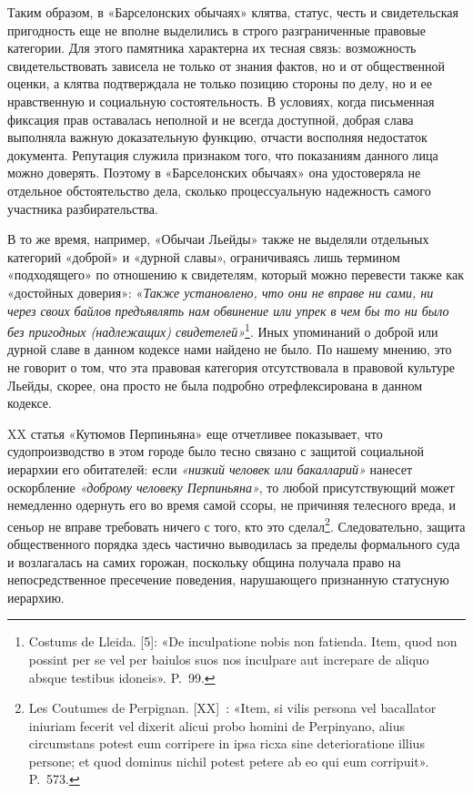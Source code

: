 Таким образом, в «Барселонских обычаях» клятва, статус, честь и свидетельская пригодность еще не вполне выделились в строго разграниченные правовые категории. Для этого памятника характерна их тесная связь: возможность свидетельствовать зависела не только от знания фактов, но и от общественной оценки, а клятва подтверждала не только позицию стороны по делу, но и ее нравственную и социальную состоятельность. В условиях, когда письменная фиксация прав оставалась неполной и не всегда доступной, добрая слава выполняла важную доказательную функцию, отчасти восполняя недостаток документа. Репутация служила признаком того, что показаниям данного лица можно доверять. Поэтому в «Барселонских обычаях» она удостоверяла не отдельное обстоятельство дела, сколько процессуальную надежность самого участника разбирательства.

В то же время, например, «Обычаи Льейды» также не выделяли отдельных категорий «доброй» и «дурной славы», ограничиваясь лишь термином «подходящего» по отношению к свидетелям, который можно перевести также как «достойных доверия»: «\emph{Также установлено, что они не вправе ни сами, ни через своих }\emph{байлов}\emph{ предъявлять нам обвинение или упрек в чем бы то ни было без пригодных (надлежащих) свидетелей»}\footnote{Costums de Lleida. [5]: «De inculpatione nobis non fatienda. Item, quod non possint per se vel per baiulos suos nos inculpare aut increpare de aliquo absque testibus idoneis». P.~99.}. Иных упоминаний о доброй или дурной славе в данном кодексе нами найдено не было. По нашему мнению, это не говорит о том, что эта правовая категория отсутствовала в правовой культуре Льейды, скорее, она просто не была подробно отрефлексирована в данном кодексе.

XX статья «Кутюмов Перпиньяна» еще отчетливее показывает, что судопроизводство в этом городе было тесно связано с защитой социальной иерархии его обитателей: если \emph{«низкий человек или }\emph{бакалларий}\emph{»} нанесет оскорбление \emph{«доброму человеку Перпиньяна»}, то любой присутствующий может немедленно одернуть его во время самой ссоры, не причиняя телесного вреда, и сеньор не вправе требовать ничего с того, кто это сделал\footnote{Les Coutumes de Perpignan. [XX]~: «Item, si vilis persona vel bacallator iniuriam fecerit vel dixerit alicui probo homini de Perpinyano, alius circumstans potest eum corripere in ipsa ricxa sine deterioratione illius persone; et quod dominus nichil potest petere ab eo qui eum corripuit». P.~573.}. Следовательно, защита общественного порядка здесь частично выводилась за пределы формального суда и возлагалась на самих горожан, поскольку община получала право на непосредственное пресечение поведения, нарушающего признанную статусную иерархию.

